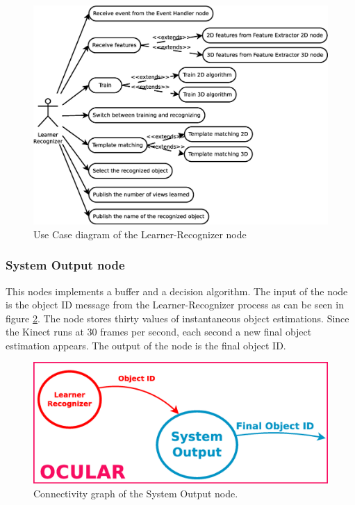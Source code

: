 	\begin{figure}[H]
		\centering
			\includegraphics[scale=0.4]{img/diagrams/uc_learner_recognizer.eps}
			\caption[Use case diagram Learner-Recognizer node]{Use Case diagram of the Learner-Recognizer node}
			\label{uc_learner_recognizer}
	\end{figure}



\subsubsection{System Output node}
\label{last_node}
	This nodes implements a buffer and a decision algorithm. 
	The input of the node is the object ID message from the Learner-Recognizer process as can be seen in figure \ref{node_output}.
	The node stores thirty values of instantaneous object estimations. 
	Since the Kinect runs at 30 frames per second, each second a new final object estimation appears. 
	The output of the node is the final object ID. 


		\begin{figure}[H]
			\begin{center}
			\includegraphics[width=0.5\linewidth]{img/diagrams/node_output.eps}
			\caption[System Output node I/O]{Connectivity graph of the System Output node.}		
			\label{node_output}
			\end{center}
		\end{figure}

